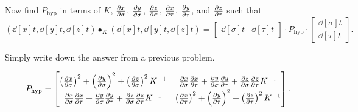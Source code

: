 \documentclass{ximera}
\begin{document}
\begin{problem}
  Now find $P_\mathrm{hyp}$ in terms of $K$, $\pp[x]{\sigma}$, $\pp[y]{\sigma}$,
  $\pp[z]{\sigma}$, $\pp[x]{\tau}$, $\pp[y]{\tau}$, and $\pp[z]{\tau}$
  such that
  \[
  \left(\dd[x]{t}, \dd[y]{t}, \dd[z]{t}\right)\bullet_K
  \left(\dd[x]{t}, \dd[y]{t}, \dd[z]{t}\right)
  =
  \begin{bmatrix}
    \dd[\sigma]{t} &  \dd[\tau]{t}
  \end{bmatrix}
  \cdot P_\mathrm{hyp}
  \cdot
  \begin{bmatrix}
    \dd[\sigma]{t} \\  \dd[\tau]{t}
  \end{bmatrix}.
  \]
  \begin{hint}
    Simply write down the answer from a previous problem.
  \end{hint}
  \begin{freeResponse}
    \[
    P_\mathrm{hyp} =
    \begin{bmatrix}
        \left(\pp[x]{\sigma}\right)^2 + \left(\pp[y]{\sigma}\right)^2 + \left(\pp[z]{\sigma}\right)^2K^{-1} & \pp[x]{\sigma}\pp[x]{\tau} + \pp[y]{\sigma}\pp[y]{\tau} + \pp[z]{\sigma}\pp[z]{\tau} K^{-1}\\
        \pp[x]{\sigma}\pp[x]{\tau} + \pp[y]{\sigma}\pp[y]{\tau} + \pp[z]{\sigma}\pp[z]{\tau} K^{-1}       & \left(\pp[x]{\tau}\right)^2 + \left(\pp[y]{\tau}\right)^2 + \left(\pp[z]{\tau}\right)^2K^{-1}
      \end{bmatrix}.
    \]
  \end{freeResponse}
\end{problem}
\end{document}
